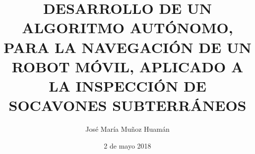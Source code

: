\documentclass[a4paper, 12pt, oneside]{JMtesis}
\begin{document}
\frontmatter
{}
\title {DESARROLLO DE UN ALGORITMO AUT\'ONOMO, PARA LA NAVEGACI\'ON DE UN ROBOT M\'OVIL, APLICADO A LA INSPECCI\'ON DE SOCAVONES SUBTERR\'ANEOS}
\author{Jos\'e Mar\'ia Muñoz Huam\'an}
\date{2 de mayo 2018}

\maketitle
{}

%
%
%

\tableofcontents


\mainmatter
\pagestyle{fancy}


%



%
%

% 


\renewcommand{\bibname}{\large\bf{REFERENCIAS BIBLIOGR\'AFICAS}}
\end{document}
